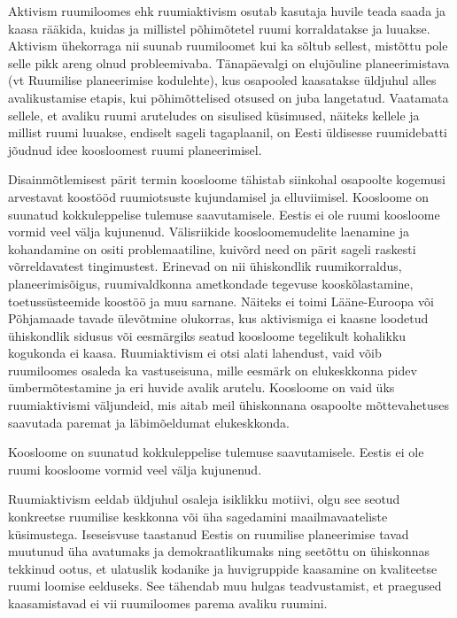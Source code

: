 \documentclass[estonian,]{article}
\begin{document}
Aktivism ruumiloomes ehk ruumiaktivism osutab kasutaja huvile teada saada ja kaasa rääkida, kuidas ja millistel põhimõtetel ruumi korraldatakse ja luuakse. Aktivism ühekorraga nii suunab ruumiloomet kui ka sõltub sellest, mistõttu pole selle pikk areng olnud probleemivaba. Tänapäevalgi on elujõuline planeerimistava (vt Ruumilise planeerimise kodulehte), kus osapooled kaasatakse üldjuhul alles avalikustamise etapis, kui põhimõttelised otsused on juba langetatud. Vaatamata sellele, et avaliku ruumi aruteludes on sisulised küsimused, näiteks kellele ja millist ruumi luuakse, endiselt sageli tagaplaanil, on Eesti üldisesse ruumidebatti jõudnud idee koosloomest ruumi planeerimisel.

Disainmõtlemisest pärit termin koosloome tähistab siinkohal osapoolte kogemusi arvestavat koostööd ruumiotsuste kujundamisel ja elluviimisel. Koosloome on suunatud kokkuleppelise tulemuse saavutamisele. Eestis ei ole ruumi koosloome vormid veel välja kujunenud. Välisriikide koosloomemudelite laenamine ja kohandamine on ositi problemaatiline, kuivõrd need on pärit sageli raskesti võrreldavatest tingimustest. Erinevad on nii ühiskondlik ruumikorraldus, planeerimisõigus, ruumivaldkonna ametkondade tegevuse kooskõlastamine, toetussüsteemide koostöö ja muu sarnane. Näiteks ei toimi Lääne-Euroopa või Põhjamaade tavade ülevõtmine olukorras, kus aktivismiga ei kaasne loodetud ühiskondlik sidusus või eesmärgiks seatud koosloome tegelikult kohalikku kogukonda ei kaasa. Ruumiaktivism ei otsi alati lahendust, vaid võib ruumiloomes osaleda ka vastuseisuna, mille eesmärk on elukeskkonna pidev ümbermõtestamine ja eri huvide avalik arutelu. Koosloome on vaid üks ruumiaktivismi väljundeid, mis aitab meil ühiskonnana osapoolte mõttevahetuses saavutada paremat ja läbimõeldumat elukeskkonda.

\begin{blockquote-right}
Koosloome on suunatud kokkuleppelise tulemuse saavutamisele. Eestis ei
ole ruumi koosloome vormid veel välja kujunenud.
\end{blockquote-right}

Ruumiaktivism eeldab üldjuhul osaleja isiklikku motiivi, olgu see seotud konkreetse ruumilise keskkonna või üha sagedamini maailmavaateliste küsimustega. Iseseisvuse taastanud Eestis on ruumilise planeerimise tavad muutunud üha avatumaks ja demokraatlikumaks ning seetõttu on ühiskonnas tekkinud ootus, et ulatuslik kodanike ja huvigruppide kaasamine on kvaliteetse ruumi loomise eelduseks. See tähendab muu hulgas teadvustamist, et praegused kaasamistavad ei vii ruumiloomes parema avaliku ruumini.
\end{document}
